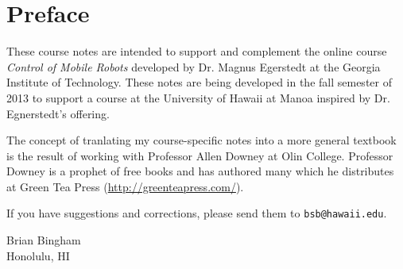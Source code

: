 \chapter{Preface}

These course notes are intended to support and complement the online course \emph{Control of Mobile Robots} developed by Dr. Magnus Egerstedt at the Georgia Institute of Technology.  These notes are being developed in the fall semester of 2013 to support a course at the University of Hawaii at Manoa inspired by Dr. Egnerstedt's offering.  

The concept of tranlating my course-specific notes into a more general textbook is the result of working with Professor Allen Downey at Olin College.  Professor Downey is a prophet of free books and has authored many which he distributes at Green Tea Press (\url{http://greenteapress.com/}).

If you have suggestions and corrections, please send them to
{\tt bsb@hawaii.edu}.

\vspace{0.25in}

\noindent Brian Bingham \\
\noindent Honolulu, HI 

